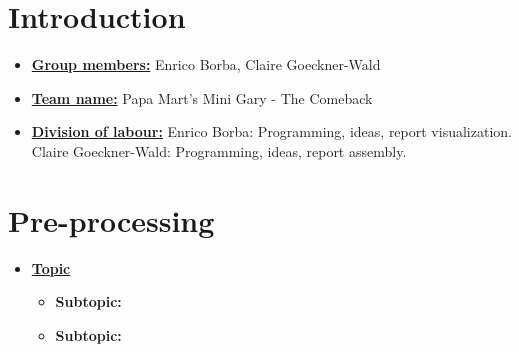 \newif\ifshowsolutions
\showsolutionstrue

\newcommand{\boldline}[1]{\underline{\textbf{#1}}}



\pagestyle{fancy}





\section{Introduction}
\medskip
\begin{itemize}

    \item \boldline{Group members:} Enrico Borba, Claire Goeckner-Wald
    \item \boldline{Team name:} Papa Mart's Mini Gary - The Comeback
    \item \boldline{Division of labour:}
        Enrico Borba: Programming, ideas, report visualization.
        Claire Goeckner-Wald: Programming, ideas, report assembly.

\end{itemize}


\section{Pre-processing}
\medskip
\begin{itemize}

    \item \boldline{Topic}
    \begin{itemize}
        \item \textbf{Subtopic:}
        \item \textbf{Subtopic:}
    \end{itemize}


\end{itemize}

